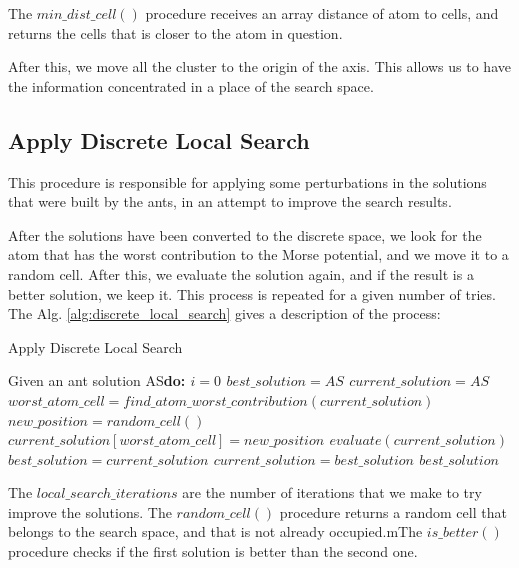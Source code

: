 			The $min\_dist\_cell()$ procedure receives an array distance of atom to cells, and returns the cells that is closer to the atom in question.
			
			After this, we move all the cluster to the origin of the axis. This allows us to have the information concentrated in a place of the search space. 
			
			\subsection{Apply Discrete Local Search}
			This procedure is responsible for applying some perturbations in the solutions that were built by the ants, in an attempt to improve the search results.

			After the solutions have been converted to the discrete space, we look for the atom that has the worst contribution to the Morse potential, and we move it to a random cell.  After this, we evaluate the solution again, and if the result is a better solution, we keep it. This process is repeated for a given number of tries. The Alg. \ref{alg:discrete_local_search} gives a description of the process:
	
			\begin{algorithm}
				\caption{Apply Discrete Local Search}
				\label{alg:discrete_local_search}
				\begin{algorithmic}
				\STATE Given an ant solution AS\bf{do}:
				\STATE $i = 0$
				\STATE $best\_solution = AS$
				\STATE $current\_solution = AS$
					\STATE $worst\_atom\_cell = find\_atom\_worst\_contribution(current\_solution)$
					\STATE $new\_position = random\_cell()$
					\STATE $current\_solution[worst\_atom\_cell] = new\_position$
					\STATE $evaluate(current\_solution)$
						\STATE $best\_solution = current\_solution$
					\ELSE
						\STATE $current\_solution = best\_solution$
					\ENDIF
				\ENDWHILE
				\RETURN $best\_solution$
				\end{algorithmic}
			\end{algorithm}		
			
			The $local\_search\_iterations$ are the number of iterations that we make to try improve the solutions.	The $random\_cell()$ procedure returns a random cell that belongs to the search space, and that is not already occupied.mThe $is\_better()$ procedure checks if the first solution is better than the second one.
